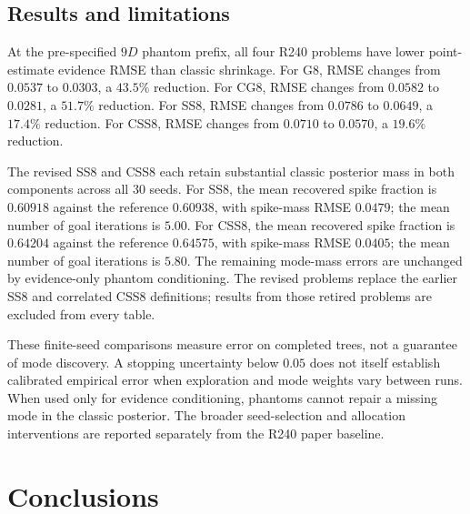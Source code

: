 \documentclass[pdflatex,sn-basic,icol]{sn-jnl}
\theoremstyle{plain}
\theoremstyle{definition}
\begin{document}
\clearpage
\subsection{Results and limitations}

At the pre-specified $9D$ phantom prefix, all four R240 problems have lower point-estimate evidence RMSE than classic shrinkage.
For G8, RMSE changes from $0.0537$ to $0.0303$, a $43.5\%$ reduction.
For CG8, RMSE changes from $0.0582$ to $0.0281$, a $51.7\%$ reduction.
For SS8, RMSE changes from $0.0786$ to $0.0649$, a $17.4\%$ reduction.
For CSS8, RMSE changes from $0.0710$ to $0.0570$, a $19.6\%$ reduction.

The revised SS8 and CSS8 each retain substantial classic posterior mass in both components across all 30 seeds.
For SS8, the mean recovered spike fraction is $0.60918$ against the reference $0.60938$, with spike-mass RMSE $0.0479$; the mean number of goal iterations is $5.00$.
For CSS8, the mean recovered spike fraction is $0.64204$ against the reference $0.64575$, with spike-mass RMSE $0.0405$; the mean number of goal iterations is $5.80$.
The remaining mode-mass errors are unchanged by evidence-only phantom conditioning.
The revised problems replace the earlier SS8 and correlated CSS8 definitions; results from those retired problems are excluded from every table.

These finite-seed comparisons measure error on completed trees, not a guarantee of mode discovery. A stopping uncertainty below $0.05$ does not itself establish calibrated empirical error when exploration and mode weights vary between runs.
When used only for evidence conditioning, phantoms cannot repair a missing mode in the classic posterior. The broader seed-selection and allocation interventions are reported separately from the R240 paper baseline.

\section{Conclusions}\label{sec:conclusion}
\end{document}
